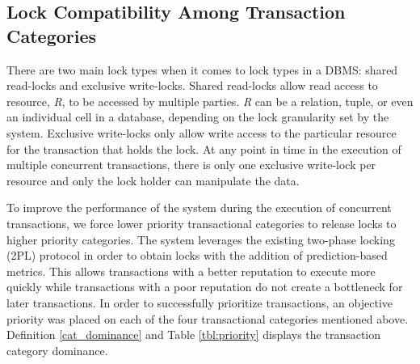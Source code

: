 \documentclass[conference]{IEEEtran}
\begin{document}
\subsection{Lock Compatibility Among Transaction Categories}
There are two main lock types when it comes to lock types in a DBMS: shared read-locks and exclusive write-locks. Shared read-locks allow read access to resource, \textit{R}, to be accessed by multiple parties. \textit{R} can be a relation, tuple, or even an individual cell in a database, depending on the lock granularity set by the system. Exclusive write-locks only allow write access to the particular resource for the transaction that holds the lock. At any point in time in the execution of multiple concurrent transactions, there is only one exclusive write-lock per resource and only the lock holder can manipulate the data.

To improve the performance of the system during the execution of concurrent transactions, we force lower priority transactional categories to release locks to higher priority categories. The system leverages the existing two-phase locking (2PL) protocol in order to obtain locks with the addition of prediction-based metrics. This allows transactions with a better reputation to execute more quickly while transactions with a poor reputation do not create a bottleneck for later transactions. In order to successfully prioritize transactions, an objective priority was placed on each of the four transactional categories mentioned above. Definition \ref{cat_dominance} and Table \ref{tbl:priority} displays the transaction category dominance.
\end{document}
